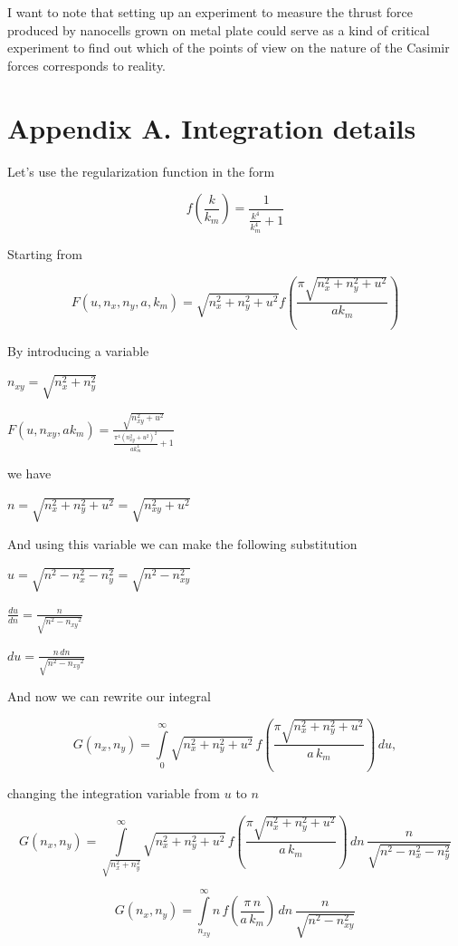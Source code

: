 \documentclass[11pt]{article}
\begin{document}
I want to note that setting up an experiment to measure the thrust force
produced by nanocells grown on metal plate could serve as a kind of critical
experiment to find out which of the points of view on the nature of the
Casimir forces corresponds to reality.

    \section{Appendix A. Integration
details}\label{appendix-a.-integration-details}

    Let's use the regularization function in the form

    \[f\left(\frac{k}{k_m}\right) = \frac{1}{\frac{k^{4}}{k_{m}^{4}} + 1}\]

    Starting from

    \[F\left(u, n_x, n_y, a, k_m\right) = \sqrt{n_{x}^{2} + n_{y}^{2} + u^{2}} f\left(\frac{\pi \sqrt{n_{x}^{2} + n_{y}^{2} + u^{2}}}{a k_{m}}\right)\]

    By introducing a variable

\(n_{xy} = \sqrt{n_x^2 + n_y^2}\)

    \(F\left(u, n_{xy}, ak_m\right) = \frac{\sqrt{n_{\mathit{xy}}^{2} + u^{2}}}{\frac{\pi^{4} {\left(n_{\mathit{xy}}^{2} + u^{2}\right)}^{2}}{\mathit{ak}_{m}^{4}} + 1}\)

    we have

\(n = \sqrt{n_x^2 + n_y^2 + u^2} = \sqrt{n_{xy}^2 + u^2}\)

And using this variable we can make the following substitution

\(u = \sqrt{n^2 - n_x^2 - n_y^2} = \sqrt{n^2 - n_{xy}^2}\)

\(\frac{du}{dn} = \frac{n}{\sqrt{n^{2} - \mathit{n_{xy}}^{2}}}\)

\(d{u}= \frac{n\,d{n}}{\sqrt{n^{2} - \mathit{n_{xy}}^{2}}}\)

    And now we can rewrite our integral

    \[G\left(n_x, n_y\right) = \int\limits_{0}^{\infty}\sqrt{n_x^2 + n_y^2+u^2}\,
f\left(\frac{\pi\sqrt{n_x^2 + n_y^2+u^2}}{a\,k_m}\right)\,d{u}, 
\]

changing the integration variable from \(u\) to \(n\)

    \[
G\left(n_x, n_y\right) = \int\limits_{\sqrt{n_x^2 + n_y^2}}^{\infty}\sqrt{n_x^2 + n_y^2+u^2}\,
f\left(\frac{\pi\sqrt{n_x^2 + n_y^2+u^2}}{a\,k_m}\right)\,dn\,{\frac{n}{\sqrt{n^{2} - n_{x}^{2} - n_{y}^{2}}}}
\]

    \[
G\left(n_x, n_y\right) = \int\limits_{n_{xy}}^{\infty}n\,
f\left(\frac{\pi\,n}{a\,k_m}\right)\,dn\,{\frac{n}{\sqrt{n^{2} - n_{xy}^{2}}}}
\]
\end{document}
